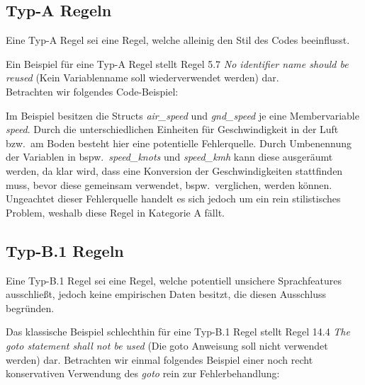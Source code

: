 \documentclass[a4paper,UKenglish,cleveref, autoref]{templates/lipics-v2019}
\begin{document}
    \subsection{Typ-A Regeln}
    \label{subsec:typ-a-regeln}
    \begin{definition}
        Eine Typ-A Regel sei eine Regel, welche alleinig den Stil des Codes beeinflusst.
    \end{definition}

    Ein Beispiel für eine Typ-A Regel stellt Regel 5.7 \textit{No identifier name should be reused}
    (Kein Variablenname soll wiederverwendet werden) dar.\\
    Betrachten wir folgendes Code-Beispiel:

    \noindent
    \begin{minipage}{\linewidth}
        \begin{example}
            
        \end{example}
    \end{minipage}

    Im Beispiel besitzen die Structs \textit{air\_speed} und \textit{gnd\_speed} je eine Membervariable \textit{speed}.
    Durch die unterschiedlichen Einheiten für Geschwindigkeit in der Luft bzw.\ am Boden besteht hier eine potentielle
    Fehlerquelle.
    Durch Umbenennung der Variablen in bspw.\ \textit{speed\_knots} und \textit{speed\_kmh} kann diese ausgeräumt werden,
    da klar wird, dass eine Konversion der Geschwindigkeiten stattfinden muss, bevor diese gemeinsam verwendet, bspw.\ verglichen,
    werden können.
    Ungeachtet dieser Fehlerquelle handelt es sich jedoch um ein rein stilistisches Problem, weshalb diese Regel in
    Kategorie A fällt.

    \subsection{Typ-B.1 Regeln}
    \label{subsec:typ-b-1-regeln}
    \begin{definition}
        Eine Typ-B.1 Regel sei eine Regel, welche potentiell unsichere Sprachfeatures ausschließt,
        jedoch keine empirischen Daten besitzt, die diesen Ausschluss begründen.
    \end{definition}

    Das klassische Beispiel schlechthin für eine Typ-B.1 Regel stellt Regel 14.4 \textit{The goto statement shall not be used}
    (Die goto Anweisung soll nicht verwendet werden) dar.
    Betrachten wir einmal folgendes Beispiel einer noch recht konservativen Verwendung des \textit{goto} rein zur
    Fehlerbehandlung:
\end{document}
